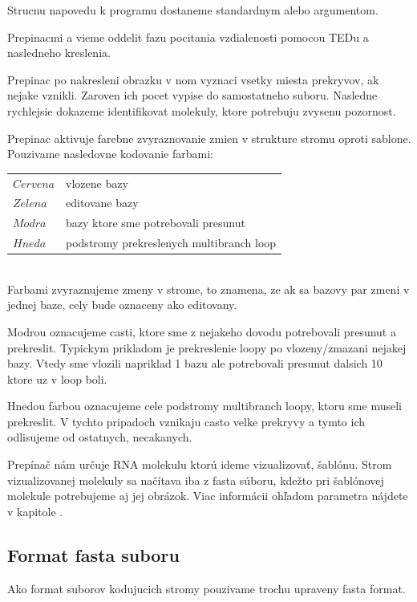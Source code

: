 Strucnu napovedu k programu dostaneme standardnym  alebo  argumentom.

Prepinacmi  a  vieme oddelit fazu pocitania vzdialenosti pomocou TEDu a nasledneho kreslenia.

Prepinac  po nakresleni obrazku v nom vyznaci vsetky miesta prekryvov, ak nejake vznikli.
Zaroven ich pocet vypise do samostatneho suboru. Nasledne rychlejsie dokazeme identifikovat molekuly, ktore
potrebuju zvysenu pozornost.

Prepinac  aktivuje farebne zvyraznovanie zmien v strukture stromu oproti sablone.
Pouzivame nasledovne kodovanie farbami:

\begin{tabular}{@{$\bullet$ }ll}
  $Cervena$ & vlozene bazy
  \\
  $Zelena$  & editovane bazy
  \\
  $Modra$   & bazy ktore sme potrebovali presunut
  \\
  $Hneda$   & podstromy prekreslenych multibranch loop
\end{tabular}
\\

Farbami zvyraznujeme zmeny v strome, to znamena, ze ak sa bazovy par zmeni v jednej baze,
cely bude oznaceny ako editovany.

Modrou oznacujeme casti, ktore sme z nejakeho dovodu potrebovali presunut a prekreslit. Typickym prikladom
je prekreslenie loopy po vlozeny/zmazani nejakej bazy. Vtedy sme vlozili napriklad 1 bazu ale potrebovali
presunut dalsich 10 ktore uz v loop boli.

Hnedou farbou oznacujeme cele podstromy multibranch loopy, ktoru sme museli prekreslit.
V tychto pripadoch vznikaju casto velke prekryvy a tymto ich odlisujeme od ostatnych, necakanych.

Prepínač  nám určuje RNA molekulu ktorú ideme vizualizovať, 
šablónu. Strom vizualizovanej molekuly sa načítava iba z fasta súboru, kdežto pri šablónovej molekule
potrebujeme aj jej obrázok. Viac informácii ohľadom parametra  nájdete v kapitole .

\subsection{Format fasta suboru}

Ako format suborov kodujucich stromy pouzivame trochu upraveny fasta format.

